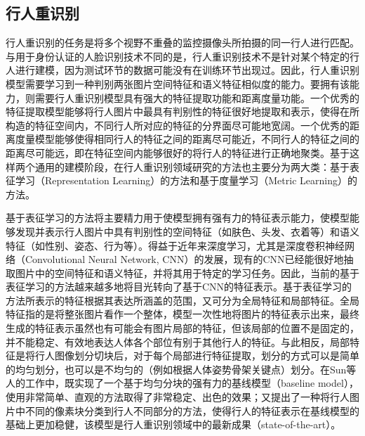 \subsection{行人重识别}

行人重识别的任务是将多个视野不重叠的监控摄像头所拍摄的同一行人进行匹配\cite{chen2018person}。与用于身份认证的人脸识别技术不同的是，行人重识别技术不是针对某个特定的行人进行建模，因为测试环节的数据可能没有在训练环节出现过。因此，行人重识别模型需要学习到一种判别两张图片空间特征和语义特征相似度的能力。要拥有该能力，则需要行人重识别模型具有强大的特征提取功能和距离度量功能。一个优秀的特征提取模型能够将行人图片中最具有判别性的特征很好地提取和表示，使得在所构造的特征空间内，不同行人所对应的特征的分界面尽可能地宽阔。一个优秀的距离度量模型能够使得相同行人的特征之间的距离尽可能近，不同行人的特征之间的距离尽可能远，即在特征空间内能够很好的将行人的特征进行正确地聚类。基于这样两个通用的建模阶段，在行人重识别领域研究的方法也主要分为两大类：基于表征学习（Representation Learning）的方法和基于度量学习（Metric Learning）的方法。

基于表征学习的方法将主要精力用于使模型拥有强有力的特征表示能力，使模型能够发现并表示行人图片中具有判别性的空间特征（如肤色、头发、衣着等）和语义特征（如性别、姿态、行为等）。得益于近年来深度学习\cite{simonyan2014very}，尤其是深度卷积神经网络\cite{krizhevsky2012imagenet}（Convolutional Neural Network, CNN）的发展，现有的CNN已经能很好地抽取图片中的空间特征和语义特征，并将其用于特定的学习任务。因此，当前的基于表征学习的方法越来越多地将目光转向了基于CNN的特征表示。基于表征学习的方法所表示的特征根据其表达所涵盖的范围，又可分为全局特征和局部特征。全局特征指的是将整张图片看作一个整体，模型一次性地将图片的特征表示出来，最终生成的特征表示虽然也有可能会有图片局部的特征，但该局部的位置不是固定的，并不能稳定、有效地表达人体各个部位有别于其他行人的特征。与此相反，局部特征是将行人图像划分切块后，对于每个局部进行特征提取，划分的方式可以是简单的均匀划分\cite{sun2017beyond}，也可以是不均匀的（例如根据人体姿势骨架关键点\cite{zheng2017pose}）划分。在Sun等人\cite{sun2017beyond}的工作中，既实现了一个基于均匀分块的强有力的基线模型（baseline model），使用非常简单、直观的方法取得了非常稳定、出色的效果；又提出了一种将行人图片中不同的像素块分类到行人不同部分的方法，使得行人的特征表示在基线模型的基础上更加稳健，该模型是行人重识别领域中的最新成果（state-of-the-art）。

